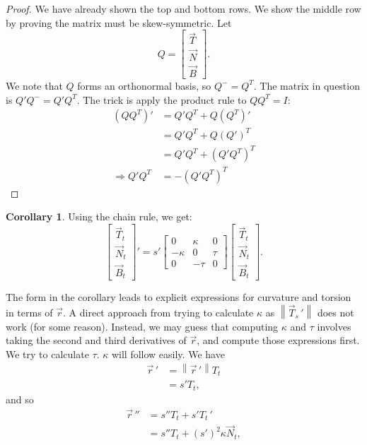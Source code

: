 \documentclass{article}
\theoremstyle{definition}
\newtheorem{cor}{Corollary}[subsubsection]
\begin{document}
\begin{proof}
	We have already shown the top and bottom rows. We show the middle row by proving the matrix must be skew-symmetric. Let \[Q=\begin{bmatrix}\vec T\\\vec N\\\vec B\end{bmatrix}.\] We note that $Q$ forms an orthonormal basis, so $Q^-=Q^T$. The matrix in question is $Q'Q^-=Q'Q^T$. The trick is apply the product rule to $QQ^T=I$:
	\begin{align*}
		(QQ^T)'&=Q'Q^T+Q(Q^T)'\\
		&=Q'Q^T+Q(Q')^T\\
		&=Q'Q^T+(Q'Q^T)^T\\
		\Rightarrow Q'Q^T&=-(Q'Q^T)^T
	\end{align*}
\end{proof}
\begin{cor}
	Using the chain rule, we get:
	\[\begin{bmatrix}\vec T_t\\\vec N_t\\\vec B_t\end{bmatrix}'=s'\begin{bmatrix}0&\kappa&0\\-\kappa&0&\tau\\0&-\tau&0\end{bmatrix}\begin{bmatrix}\vec T_t\\\vec N_t\\\vec B_t\end{bmatrix}.\]
\end{cor}
The form in the corollary leads to explicit expressions for curvature and torsion in terms of $\vec r$. A direct approach from trying to calculate $\kappa$ as $\left\lVert\vec T_s\,'\right\rVert$ does not work (for some reason). Instead, we may guess that computing $\kappa$ and $\tau$ involves taking the second and third derivatives of $\vec r$, and compute those expressions first.
We try to calculate $\tau$. $\kappa$ will follow easily. We have
\begin{align*}
	\vec r\,'&=\left\lVert\vec r\,'\right\rVert T_t\\
	&=s'T_t,
\end{align*}
and so
\begin{align*}
	\vec r\,''&=s''T_t+s'T_t\,'\\
	&=s''T_t+(s')^2\kappa \vec N_t,
\end{align*}
\end{document}

